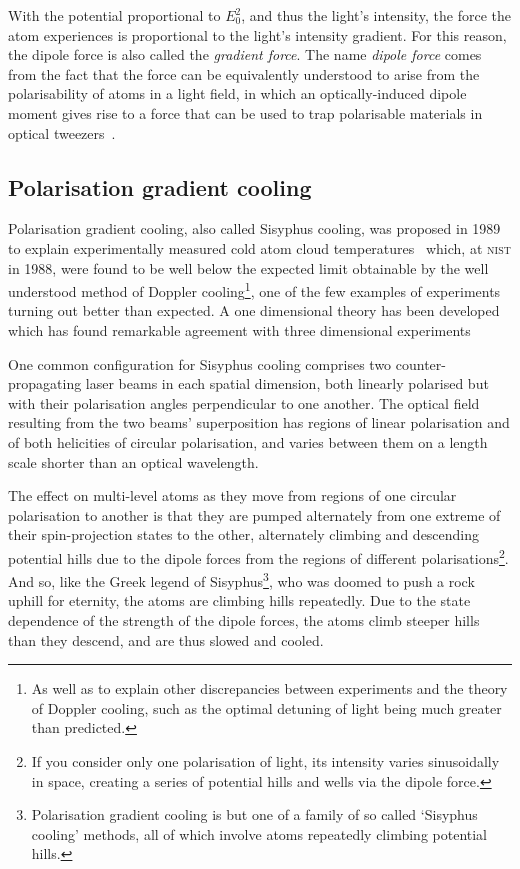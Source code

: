 With the potential proportional to $E_0^2$, and thus the light's intensity, the force the atom experiences is proportional to the light's intensity gradient. For this reason, the dipole force is also called the \emph{gradient force}. The name \emph{dipole force} comes from the fact that the force can be equivalently understood to arise from the polarisability of atoms in a light field, in which an optically-induced dipole moment gives rise to a force that can be used to trap polarisable materials in optical tweezers~\cite{ashkin_acceleration_1970}.

\subsection{Polarisation gradient cooling}

Polarisation gradient cooling, also called Sisyphus cooling, was proposed in 1989~\cite{dalibard_laser_1989, ungar_optical_1989} to explain experimentally measured cold atom cloud temperatures~\cite{lett_optical_1989} which, at \textsc{nist} in 1988, were found to be well below the expected limit obtainable by the well understood method of Doppler cooling\footnote{As well as to explain other discrepancies between experiments and the theory of Doppler cooling, such as the optimal detuning of light being much greater than predicted.}, one of the few examples of experiments turning out better than expected. A one dimensional theory has been developed~\cite{dalibard_laser_1989} which has found remarkable agreement with three dimensional experiments~\cite{salomon_laser_1990}

One common configuration for Sisyphus cooling comprises two counter-propagating laser beams in each spatial dimension, both linearly polarised but with their polarisation angles perpendicular to one another. The optical field resulting from the two beams' superposition has regions of linear polarisation and of both helicities of circular polarisation, and varies between them on a length scale shorter than an optical wavelength.

The effect on multi-level atoms as they move from regions of one circular polarisation to another is that they are pumped alternately from one extreme of their spin-projection states to the other, alternately climbing and descending potential hills due to the dipole forces from the regions of different polarisations\footnote{If you consider only one polarisation of light, its intensity varies sinusoidally in space, creating a series of potential hills and wells via the dipole force.}. And so, like the Greek legend of Sisyphus\footnote{Polarisation gradient cooling is but one of a family of so called `Sisyphus cooling' methods, all of which involve atoms repeatedly climbing potential hills.}, who was doomed to push a rock uphill for eternity, the atoms are climbing hills repeatedly. Due to the state dependence of the strength of the dipole forces, the atoms climb steeper hills than they descend, and are thus slowed and cooled.

